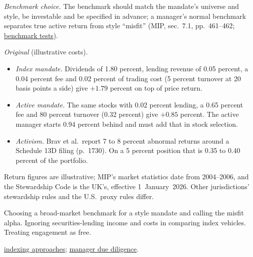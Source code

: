 \begin{qfdefinition}
\emph{Benchmark choice.} The benchmark should match the mandate's universe and style, be investable and be specified in advance; a manager's normal benchmark separates true active return from style ``misfit'' (MIP, sec.~7.1, pp.~461--462; \hyperref[meth:benchmark-selection-quality]{benchmark tests}).

 \emph{Original} (illustrative costs).
\begin{itemize}
\item \emph{Index mandate.} Dividends of 1.80 percent, lending revenue of 0.05 percent, a 0.04 percent fee and 0.02 percent of trading cost (5 percent turnover at 20 basis points a side) give $+1.79$ percent on top of price return.
\item \emph{Active mandate.} The same stocks with 0.02 percent lending, a 0.65 percent fee and 80 percent turnover (0.32 percent) give $+0.85$ percent. The active manager starts 0.94 percent behind and must add that in stock selection.
\item \emph{Activism.} Brav et al.\ report 7 to 8 percent abnormal returns around a Schedule 13D filing (p.~1730). On a 5 percent position that is 0.35 to 0.40 percent of the portfolio.
\end{itemize}

 Return figures are illustrative; MIP's market statistics date from 2004--2006, and the Stewardship Code is the UK's, effective 1~January~2026. Other jurisdictions' stewardship rules and the U.S.\ proxy rules differ.

 Choosing a broad-market benchmark for a style mandate and calling the misfit alpha. Ignoring securities-lending income and costs in comparing index vehicles. Treating engagement as free.

 \hyperref[def:cap-weighted-factor-indexing]{indexing approaches}; \hyperref[meth:manager-due-diligence]{manager due diligence}.

\end{qfdefinition}

